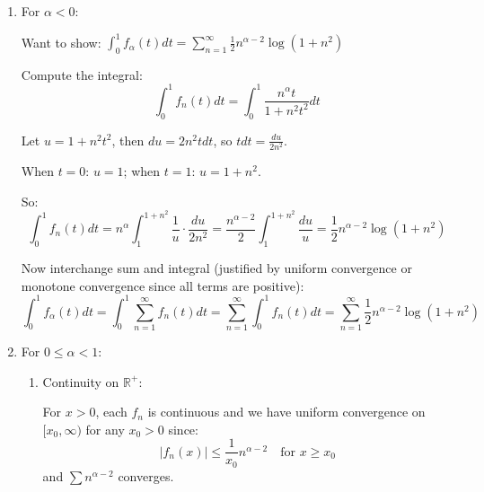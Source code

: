 \documentclass[12pt]{article}
\begin{document}
\begin{answerbox}
\begin{enumerate}
\begin{enumerate}
        $f_n(x) = \frac{x}{1+x^2} \cdot n^{\alpha-2} \cdot \frac{n^2(1+x^2)}{1+n^2 x^2} \geq \frac{x}{1+x^2} n^{\alpha-2}$ if $\frac{n^2(1+x^2)}{1+n^2 x^2} \geq 1$
        
        But $\frac{n^2(1+x^2)}{1+n^2 x^2} = \frac{n^2 + n^2 x^2}{1+n^2 x^2} \geq 1$ since $n^2 \geq 1$.
        
        \item Sum the inequalities:
        
        Let $A = \sum_{n=1}^\infty n^{\alpha-2}$ (converges since $\alpha-2 < -1$ when $\alpha < 1$).
        
        Then:
        \[
        \frac{x}{1+x^2} A \leq f_\alpha(x) \leq \frac{1}{x} A
        \]
        
        As $x \to \infty$: $\frac{x}{1+x^2} \sim \frac{1}{x}$, so $f_\alpha(x) \sim \frac{A}{x}$.
    \end{enumerate}
    
    \item For $\alpha < 0$:
    
    Want to show: $\int_0^1 f_\alpha(t) dt = \sum_{n=1}^\infty \frac{1}{2} n^{\alpha-2} \log(1+n^2)$
    
    Compute the integral:
    \[
    \int_0^1 f_n(t) dt = \int_0^1 \frac{n^\alpha t}{1+n^2 t^2} dt
    \]
    
    Let $u = 1 + n^2 t^2$, then $du = 2n^2 t dt$, so $t dt = \frac{du}{2n^2}$.
    
    When $t=0$: $u=1$; when $t=1$: $u=1+n^2$.
    
    So:
    \[
    \int_0^1 f_n(t) dt = n^\alpha \int_1^{1+n^2} \frac{1}{u} \cdot \frac{du}{2n^2} = \frac{n^{\alpha-2}}{2} \int_1^{1+n^2} \frac{du}{u} = \frac{1}{2} n^{\alpha-2} \log(1+n^2)
    \]
    
    Now interchange sum and integral (justified by uniform convergence or monotone convergence since all terms are positive):
    \[
    \int_0^1 f_\alpha(t) dt = \int_0^1 \sum_{n=1}^\infty f_n(t) dt = \sum_{n=1}^\infty \int_0^1 f_n(t) dt = \sum_{n=1}^\infty \frac{1}{2} n^{\alpha-2} \log(1+n^2)
    \]
    
    \item For $0 \leq \alpha < 1$:
    
    \begin{enumerate}
        \item Continuity on $\mathbb{R}^+$:
        
        For $x > 0$, each $f_n$ is continuous and we have uniform convergence on $[x_0, \infty)$ for any $x_0 > 0$ since:
        \[
        |f_n(x)| \leq \frac{1}{x_0} n^{\alpha-2} \quad \text{for } x \geq x_0
        \]
        and $\sum n^{\alpha-2}$ converges.
        

\end{enumerate}
\end{enumerate}
\end{answerbox}
\end{document}
